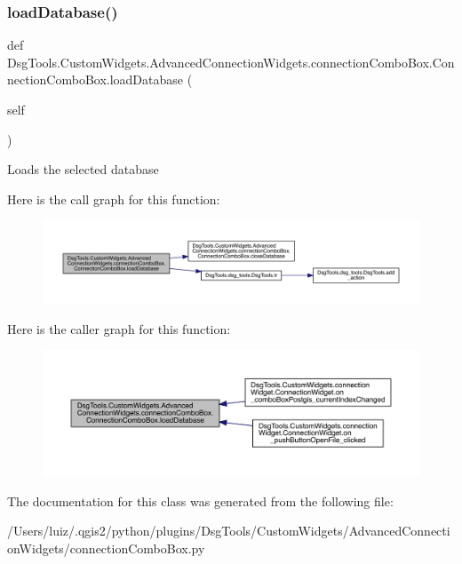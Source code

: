 \subsubsection{\texorpdfstring{load\+Database()}{loadDatabase()}}
{\footnotesize\ttfamily def Dsg\+Tools.\+Custom\+Widgets.\+Advanced\+Connection\+Widgets.\+connection\+Combo\+Box.\+Connection\+Combo\+Box.\+load\+Database (\begin{DoxyParamCaption}\item[{}]{self }\end{DoxyParamCaption})}

\begin{DoxyVerb}Loads the selected database
\end{DoxyVerb}
 Here is the call graph for this function\+:
\nopagebreak
\begin{figure}[H]
\begin{center}
\leavevmode
\includegraphics[width=350pt]{class_dsg_tools_1_1_custom_widgets_1_1_advanced_connection_widgets_1_1connection_combo_box_1_1_connection_combo_box_abaa5ac9086275fea674da54c5b96a167_cgraph}
\end{center}
\end{figure}
Here is the caller graph for this function\+:
\nopagebreak
\begin{figure}[H]
\begin{center}
\leavevmode
\includegraphics[width=350pt]{class_dsg_tools_1_1_custom_widgets_1_1_advanced_connection_widgets_1_1connection_combo_box_1_1_connection_combo_box_abaa5ac9086275fea674da54c5b96a167_icgraph}
\end{center}
\end{figure}


The documentation for this class was generated from the following file\+:\begin{DoxyCompactItemize}
\item 
/\+Users/luiz/.\+qgis2/python/plugins/\+Dsg\+Tools/\+Custom\+Widgets/\+Advanced\+Connection\+Widgets/connection\+Combo\+Box.\+py\end{DoxyCompactItemize}
